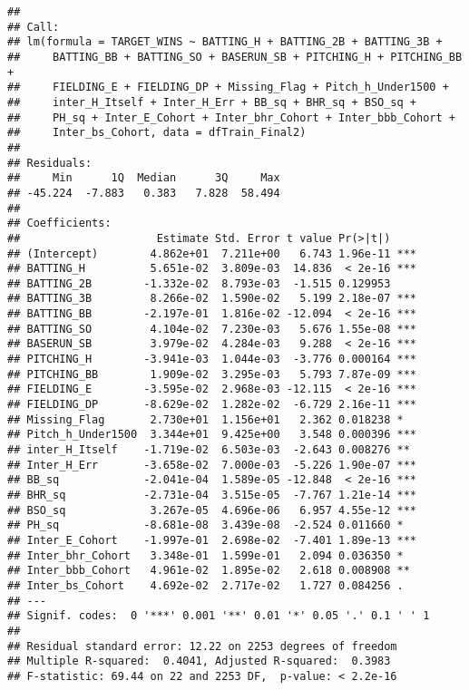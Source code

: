 \documentclass[
]{article}
\newenvironment{Shaded}{\begin{snugshade}}{\end{snugshade}}
\newcommand{\FunctionTok}[1]{\textcolor[rgb]{0.00,0.00,0.00}{#1}}
\newcommand{\NormalTok}[1]{#1}
\newcommand{\SpecialCharTok}[1]{\textcolor[rgb]{0.00,0.00,0.00}{#1}}
\begin{document}
\begin{verbatim}
## 
## Call:
## lm(formula = TARGET_WINS ~ BATTING_H + BATTING_2B + BATTING_3B + 
##     BATTING_BB + BATTING_SO + BASERUN_SB + PITCHING_H + PITCHING_BB + 
##     FIELDING_E + FIELDING_DP + Missing_Flag + Pitch_h_Under1500 + 
##     inter_H_Itself + Inter_H_Err + BB_sq + BHR_sq + BSO_sq + 
##     PH_sq + Inter_E_Cohort + Inter_bhr_Cohort + Inter_bbb_Cohort + 
##     Inter_bs_Cohort, data = dfTrain_Final2)
## 
## Residuals:
##     Min      1Q  Median      3Q     Max 
## -45.224  -7.883   0.383   7.828  58.494 
## 
## Coefficients:
##                     Estimate Std. Error t value Pr(>|t|)    
## (Intercept)        4.862e+01  7.211e+00   6.743 1.96e-11 ***
## BATTING_H          5.651e-02  3.809e-03  14.836  < 2e-16 ***
## BATTING_2B        -1.332e-02  8.793e-03  -1.515 0.129953    
## BATTING_3B         8.266e-02  1.590e-02   5.199 2.18e-07 ***
## BATTING_BB        -2.197e-01  1.816e-02 -12.094  < 2e-16 ***
## BATTING_SO         4.104e-02  7.230e-03   5.676 1.55e-08 ***
## BASERUN_SB         3.979e-02  4.284e-03   9.288  < 2e-16 ***
## PITCHING_H        -3.941e-03  1.044e-03  -3.776 0.000164 ***
## PITCHING_BB        1.909e-02  3.295e-03   5.793 7.87e-09 ***
## FIELDING_E        -3.595e-02  2.968e-03 -12.115  < 2e-16 ***
## FIELDING_DP       -8.629e-02  1.282e-02  -6.729 2.16e-11 ***
## Missing_Flag       2.730e+01  1.156e+01   2.362 0.018238 *  
## Pitch_h_Under1500  3.344e+01  9.425e+00   3.548 0.000396 ***
## inter_H_Itself    -1.719e-02  6.503e-03  -2.643 0.008276 ** 
## Inter_H_Err       -3.658e-02  7.000e-03  -5.226 1.90e-07 ***
## BB_sq             -2.041e-04  1.589e-05 -12.848  < 2e-16 ***
## BHR_sq            -2.731e-04  3.515e-05  -7.767 1.21e-14 ***
## BSO_sq             3.267e-05  4.696e-06   6.957 4.55e-12 ***
## PH_sq             -8.681e-08  3.439e-08  -2.524 0.011660 *  
## Inter_E_Cohort    -1.997e-01  2.698e-02  -7.401 1.89e-13 ***
## Inter_bhr_Cohort   3.348e-01  1.599e-01   2.094 0.036350 *  
## Inter_bbb_Cohort   4.961e-02  1.895e-02   2.618 0.008908 ** 
## Inter_bs_Cohort    4.692e-02  2.717e-02   1.727 0.084256 .  
## ---
## Signif. codes:  0 '***' 0.001 '**' 0.01 '*' 0.05 '.' 0.1 ' ' 1
## 
## Residual standard error: 12.22 on 2253 degrees of freedom
## Multiple R-squared:  0.4041, Adjusted R-squared:  0.3983 
## F-statistic: 69.44 on 22 and 2253 DF,  p-value: < 2.2e-16
\end{verbatim}

\begin{Shaded}
\end{Shaded}
\end{document}
